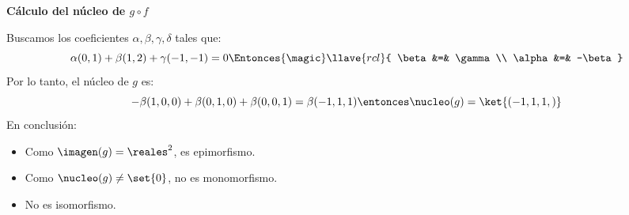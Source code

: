 \medskip
\textbf{Cálculo del núcleo de $ g \circ f $}

Buscamos los coeficientes $ \alpha, \beta, \gamma, \delta $ tales que:
$$
  \alpha(0,1) + \beta(1,2) + \gamma(-1,-1) = 0
  \Entonces{\magic}
  \llave{rcl}{
    \beta &=& \gamma\\
    \alpha &=& -\beta
  }
$$
Por lo tanto, el núcleo de $g$ es:
$$
  -\beta(1,0,0) + \beta(0,1,0) + \beta(0,0,1) = \beta(-1,1,1)
  \entonces
  \nucleo(g) = \ket{ (-1,1,1,) }
$$
En conclusión:
\begin{itemize}
  \item Como $ \imagen(g) = \reales^2 $, es epimorfismo.
  \item Como $ \nucleo(g) \neq \set{0} $, no es monomorfismo.
  \item No es isomorfismo.
\end{itemize}

\begin{aportes}
  \item {}
  \item {}
\end{aportes}
